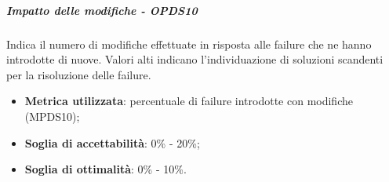 \documentclass[PdQ.tex]{subfiles}
\begin{document}
				\subparagraph{Impatto delle modifiche - OPDS10}
				Indica il numero di modifiche effettuate in risposta alle failure che ne hanno introdotte di nuove. Valori alti indicano l'individuazione di
				soluzioni scandenti per la risoluzione delle failure.
				\begin{itemize}
					\item \textbf{Metrica utilizzata}: percentuale di failure introdotte con modifiche (MPDS10);
					\item \textbf{Soglia di accettabilità}: 0\% - 20\%;
					\item \textbf{Soglia di ottimalità}: 0\% - 10\%.
				\end{itemize}
				
\end{document}
